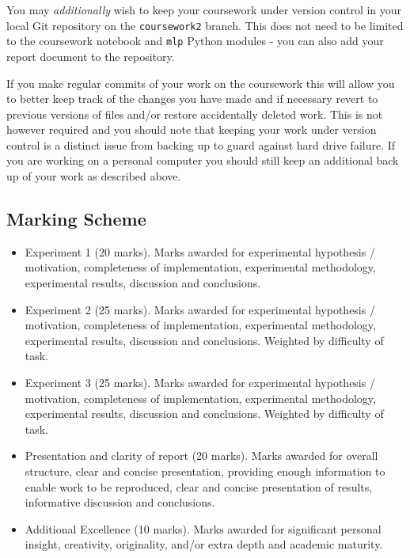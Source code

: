 \documentclass[11pt,]{article}
\begin{document}
You may \emph{additionally} wish to keep your coursework under version
control in your local Git repository on the \texttt{coursework2} branch.
This does not need to be limited to the coursework notebook and
\texttt{mlp} Python modules - you can also add your report document to
the repository.

If you make regular commits of your work on the coursework this will
allow you to better keep track of the changes you have made and if
necessary revert to previous versions of files and/or restore
accidentally deleted work. This is not however required and you should
note that keeping your work under version control is a distinct issue
from backing up to guard against hard drive failure. If you are working
on a personal computer you should still keep an additional back up of
your work as described above.

\subsection{Marking Scheme}\label{marking-scheme}

\begin{itemize}
\item
  Experiment 1 (20 marks). Marks awarded for experimental hypothesis /
  motivation, completeness of implementation, experimental methodology,
  experimental results, discussion and conclusions.
\item
  Experiment 2 (25 marks). Marks awarded for experimental hypothesis /
  motivation, completeness of implementation, experimental methodology,
  experimental results, discussion and conclusions. Weighted by
  difficulty of task.
\item
  Experiment 3 (25 marks). Marks awarded for experimental hypothesis /
  motivation, completeness of implementation, experimental methodology,
  experimental results, discussion and conclusions. Weighted by
  difficulty of task.
\item
  Presentation and clarity of report (20 marks). Marks awarded for
  overall structure, clear and concise presentation, providing enough
  information to enable work to be reproduced, clear and concise
  presentation of results, informative discussion and conclusions.
\item
  Additional Excellence (10 marks). Marks awarded for significant
  personal insight, creativity, originality, and/or extra depth and
  academic maturity.
\end{itemize}
\end{document}
